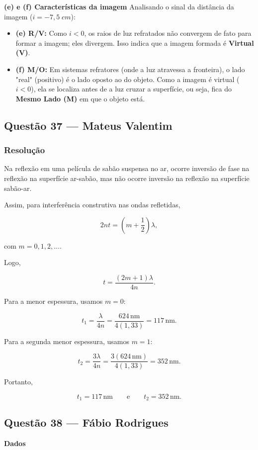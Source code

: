 \documentclass[12pt,a4paper]{article}
\begin{document}
\vspace{0.2cm}
\textbf{(e) e (f) Características da imagem}
Analisando o sinal da distância da imagem (\(i = -7,5\;cm\)):
\begin{itemize}
    \item \textbf{(e) R/V:} Como \(i < 0\), os raios de luz refratados não convergem de fato para formar a imagem; eles divergem. Isso indica que a imagem formada é \textbf{Virtual (V)}.
    \item \textbf{(f) M/O:} Em sistemas refratores (onde a luz atravessa a fronteira), o lado "real" (positivo) é o lado oposto ao do objeto. Como a imagem é virtual (\(i < 0\)), ela se localiza antes de a luz cruzar a superfície, ou seja, fica do \textbf{Mesmo Lado (M)} em que o objeto está.
\end{itemize}

\subsection{Questão 37 — Mateus Valentim}
\subsubsection{Resolução}

Na reflexão em uma película de sabão suspensa no ar, ocorre inversão de fase na
reflexão na superfície ar-sabão, mas não ocorre inversão na reflexão na
superfície sabão-ar.

Assim, para interferência construtiva nas ondas refletidas,

\[
2nt=\left(m+\frac{1}{2}\right)\lambda,
\]

com \(m=0,1,2,\ldots\).

Logo,

\[
t=\frac{(2m+1)\lambda}{4n}.
\]

Para a menor espessura, usamos \(m=0\):

\[
t_1=\frac{\lambda}{4n}
=\frac{624\,\text{nm}}{4(1{,}33)}
=117\,\text{nm}.
\]

Para a segunda menor espessura, usamos \(m=1\):

\[
t_2=\frac{3\lambda}{4n}
=\frac{3(624\,\text{nm})}{4(1{,}33)}
=352\,\text{nm}.
\]

Portanto,

\[
\boxed{t_1=117\,\text{nm}}
\qquad \text{e} \qquad
\boxed{t_2=352\,\text{nm}}.
\]

\subsection{Questão 38 — Fábio Rodrigues}
\textbf{Dados}
\end{document}
